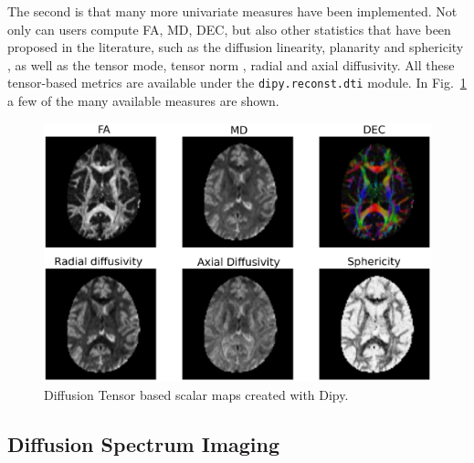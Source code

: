 \documentclass{bioinfo}
\begin{document}
The second is that many more univariate measures have been implemented. Not
only can users compute FA, MD, DEC, but also other statistics that have been
proposed in the literature, such as the diffusion linearity, planarity and
sphericity \citep{westin:97}, as well as the tensor mode, tensor norm
\citep{Ennis2006}, radial and axial diffusivity. All these tensor-based metrics
are available under the \texttt{dipy.reconst.dti} module. In Fig.~\ref{Fig:dti_metrics} a few of the many available measures are shown.

\begin{figure}
\includegraphics[scale=0.45]{Figures/dti_metrics.eps}
\centering{}
\caption{Diffusion Tensor based scalar maps created with Dipy. \label{Fig:dti_metrics}}
\end{figure}

\subsection{Diffusion Spectrum Imaging}\label{dsi}
\end{document}
